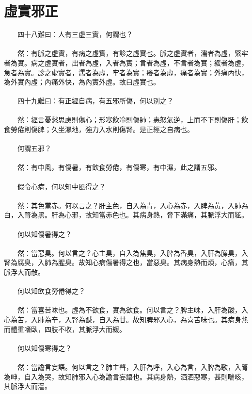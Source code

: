 \section{虛實邪正}

　　四十八難曰：人有三虛三實，何謂也？
\\\\
　　然：有脈之虛實，有病之虛實，有診之虛實也。脈之虛實者，濡者為虛，緊牢者為實。病之虛實者，出者為虛，入者為實；言者為虛，不言者為實；緩者為虛，急者為實。診之虛實者，濡者為虛，牢者為實；癢者為虛，痛者為實；外痛內快，為外實內虛；內痛外快，為內實外虛。故曰虛實也。
\\\\
　　四十九難曰：有正經自病，有五邪所傷，何以別之？
\\\\
　　然：經言憂愁思慮則傷心；形寒飲冷則傷肺；恚怒氣逆，上而不下則傷肝；飲食勞倦則傷脾；久坐濕地，強力入水則傷腎。是正經之自病也。
\\\\
　　何謂五邪？
\\\\
　　然：有中風，有傷暑，有飲食勞倦，有傷寒，有中濕，此之謂五邪。
\\\\
　　假令心病，何以知中風得之？
\\\\
　　然：其色當赤。何以言之？肝主色，自入為青，入心為赤，入脾為黃，入肺為白，入腎為黑。肝為心邪，故知當赤色也。其病身熱，脅下滿痛，其脈浮大而絃。
\\\\
　　何以知傷暑得之？
\\\\
　　然：當惡臭。何以言之？心主臭，自入為焦臭，入脾為香臭，入肝為臊臭，入腎為腐臭，入肺為腥臭。故知心病傷暑得之也，當惡臭。其病身熱而煩，心痛，其脈浮大而散。
\\\\
　　何以知飲食勞倦得之？
\\\\
　　然：當喜苦味也。虛為不欲食，實為欲食。何以言之？脾主味，入肝為酸，入心為苦，入肺為辛，入腎為鹹，自入為甘。故知脾邪入心，為喜苦味也。其病身熱而體重嗜臥，四肢不收，其脈浮大而緩。
\\\\
　　何以知傷寒得之？
\\\\
　　然：當譫言妄語。何以言之？肺主聲，入肝為呼，入心為言，入脾為歌，入腎為呻，自入為哭，故知肺邪入心為譫言妄語也。其病身熱，洒洒惡寒，甚則喘咳，其脈浮大而濇。
